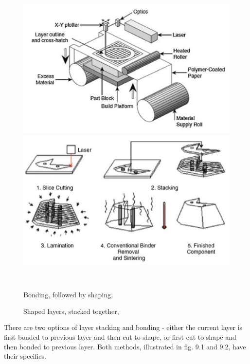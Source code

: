 \documentclass[a4paper, 11pt, reqno]{report}
\begin{document}
\begin{figure}[b!]
  \centering
  \begin{minipage}[b]{0.45\textwidth}
    \includegraphics[width=\textwidth]{SL1}
  \end{minipage}
  \hfill
  \begin{minipage}[b]{0.45\textwidth}
    \includegraphics[width=\textwidth]{SL2}
  \end{minipage}
  \\[5pt]
  \begin{minipage}[t]{0.45\textwidth}
    \caption{Bonding, followed by shaping, \cite[p. 220]{AMT}}
  \end{minipage}
  \hfill
  \begin{minipage}[t]{0.45\textwidth}
    \caption{Shaped layers, stacked together, \cite[p. 223]{AMT}}
  \end{minipage}
\end{figure}

	There are two options of layer stacking and bonding - either the current layer is first bonded to previous layer and then cut to shape, or first cut to shape and then bonded to previous layer. Both methods, illustrated in fig. 9.1 and 9.2, have their specifics.
	
\end{document}
